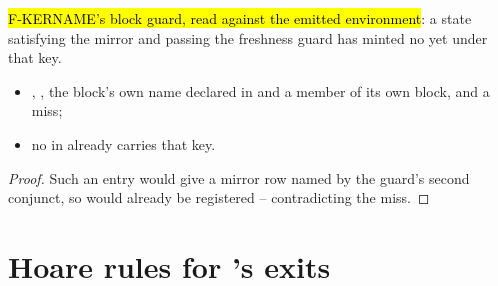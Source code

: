 \begin{lemma}
\label{lem:Erasure-blockKey_fresh_of_cover}
\leanok
{}
 \hl{F-KERNAME's block guard, read against the emitted environment}: a state
satisfying the mirror and passing the freshness guard has minted no  yet
under that key.
\begin{itemize}
\item {} , , the block's own name declared in  and a member of its own block, and a miss;
\item {} no  in  already carries that key.
\end{itemize}
\end{lemma}
\begin{proof}
\leanok
{}
 Such an entry would give a mirror row named  by the guard's second
conjunct, so  would already be registered -- contradicting the miss.
\end{proof}

\section{Hoare rules for 's exits}
\label{sec:run:exits}

